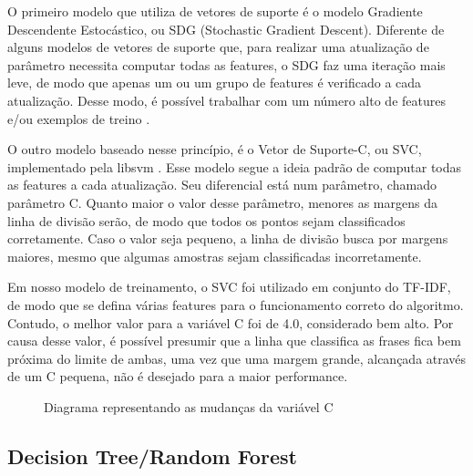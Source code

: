 O primeiro modelo que utiliza de vetores de suporte é o modelo Gradiente Descendente Estocástico, ou SDG (Stochastic Gradient Descent). Diferente de alguns modelos de vetores de suporte que, para realizar uma atualização de parâmetro necessita computar todas as features, o SDG faz uma iteração mais leve, de modo que apenas um ou um grupo de features é verificado a cada atualização. Desse modo, é possível trabalhar com um número alto de features e/ou exemplos de treino \cite{scikit-learn}.

O outro modelo baseado nesse princípio, é o Vetor de Suporte-C, ou SVC, implementado pela libsvm \cite{libsvm}. Esse modelo segue a ideia padrão de computar todas as features a cada atualização. Seu diferencial está num parâmetro, chamado parâmetro C. Quanto maior o valor desse parâmetro, menores as margens da linha de divisão serão, de modo que todos os pontos sejam classificados corretamente. Caso o valor seja pequeno, a linha de divisão busca por margens maiores, mesmo que algumas amostras sejam classificadas incorretamente.

Em nosso modelo de treinamento, o SVC foi utilizado em conjunto do TF-IDF, de modo que se defina várias features para o funcionamento correto do algoritmo. Contudo, o melhor valor para a variável C foi de 4.0, considerado bem alto. Por causa desse valor, é possível presumir que a linha que classifica as frases fica bem próxima do limite de ambas, uma vez que uma margem grande, alcançada através de um C pequena, não é desejado para a maior performance.

\begin{figure}[!htb]
    \caption{\label{fig:my-label} Diagrama representando as mudanças da variável C}
\end{figure}

\subsection{Decision Tree/Random Forest}

